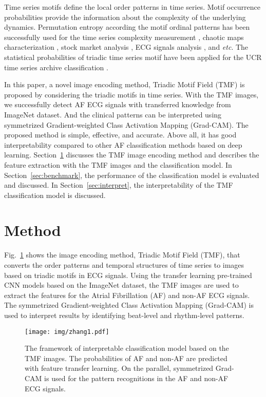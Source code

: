 \documentclass[journal]{IEEEtran}
\begin{document}
Time series motifs define the local order patterns in time series. Motif occurrence probabilities provide the information about the complexity of the underlying dynamics. Permutation entropy \cite{PE_2002} according the motif ordinal patterns has been successfully used for the time series complexity measurement \cite{PE_2002}, chaotic maps characterization \cite{chaotic_PE_2013}, stock market analysis \cite{stock_PE_2009}, ECG signals analysis \cite{ECG_PE_2015}, and {\it etc}. The statistical probabilities of triadic time series motif have been applied for the UCR time series archive classification \cite{triadic_classification_2019}.

In this paper, a novel image encoding method, Triadic Motif Field (TMF) is proposed by considering the triadic motifs in time series. With the TMF images, we successfully detect AF ECG signals with transferred knowledge from ImageNet dataset. And the clinical patterns can be interpreted using symmetrized Gradient-weighted Class Activation Mapping (Grad-CAM). The proposed method is simple, effective, and accurate. Above all, it has good interpretability compared to other AF classification methods based on deep learning.
Section~\ref{sec:method} discusses the TMF image encoding method and describes the feature extraction with the TMF images and the classification model. In Section~\ref{sec:benchmark}, the performance of the classification model is evaluated and discussed. In Section~\ref{sec:interpret}, the interpretability of the TMF  classification model is discussed. 

\section{Method}
\label{sec:method}
Fig.~\ref{fig:method} shows the image encoding method, Triadic Motif Field (TMF), that converts the order patterns and temporal structures of time series to images based on triadic motifs in ECG signals. Using the transfer learning pre-trained CNN models based on the ImageNet dataset, the TMF images are used to extract the features for the Atrial Fibrillation (AF) and non-AF ECG signals. The symmetrized Gradient-weighted Class Activation Mapping (Grad-CAM) is used to interpret results by identifying beat-level and rhythm-level patterns. 

\begin{figure}[H]
  \centering
  \texttt{[image: img/zhang1.pdf]}
  \caption{The framework of interpretable classification model based on the TMF images. The probabilities of AF and non-AF are predicted with feature transfer learning. On the parallel, symmetrized Grad-CAM is used for the pattern recognitions in the AF and non-AF ECG signals.}
  \label{fig:method}
  \end{figure}
\end{document}
